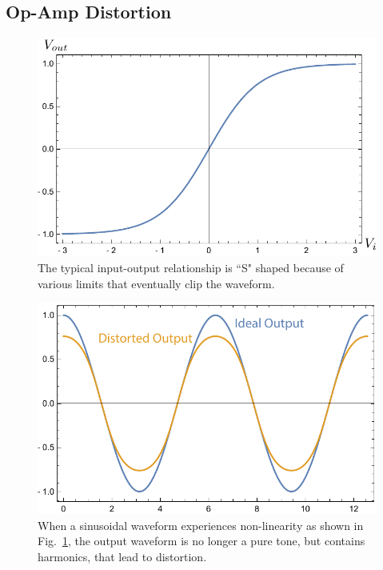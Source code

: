 \subsection{Op-Amp Distortion}
\begin{figure}[tb]
\begin{center}
\includegraphics[width=.75\columnwidth]{vtanh}
\end{center}
\caption{The typical input-output relationship is ``S" shaped because of various limits that eventually clip the waveform.}
\label{fig:vtanh}
\end{figure}
\begin{figure}[tb]
\begin{center}
\includegraphics[width=.75\columnwidth]{vdisto}
\end{center}
\caption{When a sinusoidal waveform experiences non-linearity as shown in Fig.~\ref{fig:vtanh}, the output waveform is no longer a pure tone, but contains harmonics, that lead to distortion.} \label{fig:vdisto}
\end{figure}

